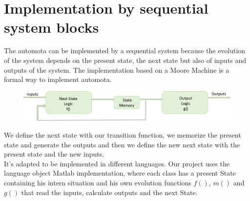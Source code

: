  \section{Implementation by sequential system blocks}
 The automota can be implemented by a sequential system because the evolution of the system depends on the present state, the next state but also of inputs and outputs of the system. The implementation based on a Moore Machine is a formal way to implement automota. 
 \begin{figure}[!ht]
       \begin{center}
      \includegraphics[width = 18cm]{./schema_FMG.pdf}
      \end{center}
  \end{figure}
  
 We define the next state with our transition function, we memorize the present state and generate the outputs and then we define the new next state with the present state and the new inputs.\\
 It's adapted to be implemented in different languages. Our project uses the language object Matlab implementation, where each class has a present State containing his intern situation and his own evolution functions $f()$, $m()$ and $g()$ that read the inputs, calculate outputs and the next State.






